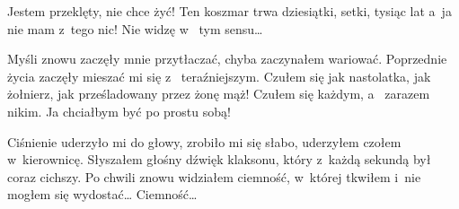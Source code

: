 Jestem przeklęty, nie chce żyć! Ten koszmar trwa dziesiątki, setki, tysiąc lat a~ja nie mam z~tego nic! Nie widzę w~
tym sensu…

Myśli znowu zaczęły mnie przytłaczać, chyba zaczynałem wariować. Poprzednie życia zaczęły mieszać mi się z~
teraźniejszym. Czułem się jak nastolatka, jak żołnierz, jak prześladowany przez żonę mąż! Czułem się każdym, a~
zarazem nikim. Ja chciałbym być po prostu sobą!

Ciśnienie uderzyło mi do głowy, zrobiło mi się słabo, uderzyłem czołem w~kierownicę. Słyszałem głośny dźwięk 
klaksonu, który z~każdą sekundą był coraz cichszy. Po chwili znowu widziałem ciemność, w~której tkwiłem i~nie mogłem 
się wydostać… Ciemność…
